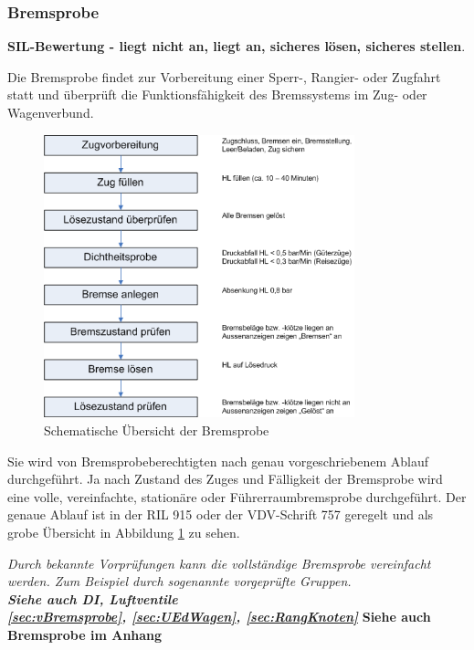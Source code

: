 \subsubsection{Bremsprobe}
\textbf{SIL-Bewertung - liegt nicht an, liegt an, sicheres lösen, sicheres stellen}.\par
Die \gls{Bremsprobe} findet zur Vorbereitung einer Sperr-, Rangier- oder Zugfahrt statt und überprüft die Funktionsfähigkeit des Bremssystems im Zug- oder Wagenverbund.\par
\begin{figure}[htbp] 
    \begin{center}
            \includegraphics[width=9cm]{Bilder/bremsprobe.png}
            \caption{Schematische Übersicht der Bremsprobe}
            \label{fig:Bremsprobe}
    \end{center}
\end{figure} 
Sie wird von Bremsprobeberechtigten nach genau vorgeschriebenem Ablauf durchgeführt. Ja nach Zustand des Zuges und Fälligkeit der \gls{Bremsprobe} wird eine volle, vereinfachte, stationäre oder Führerraumbremsprobe durchgeführt. Der genaue Ablauf ist in der \acrshort{RIL} 915 oder der VDV-Schrift 757 geregelt und als grobe Übersicht in Abbildung \ref{fig:Bremsprobe} zu sehen.\par
\textit{Durch bekannte Vorprüfungen kann die vollständige \gls{Bremsprobe} vereinfacht werden. Zum Beispiel durch sogenannte vorgeprüfte Gruppen.\\
\textbf{Siehe auch DI, Luftventile\\
\ref{sec:vBremsprobe}, \ref{sec:UEdWagen}, \ref{sec:RangKnoten}}}
\textbf{Siehe auch Bremsprobe im Anhang}

